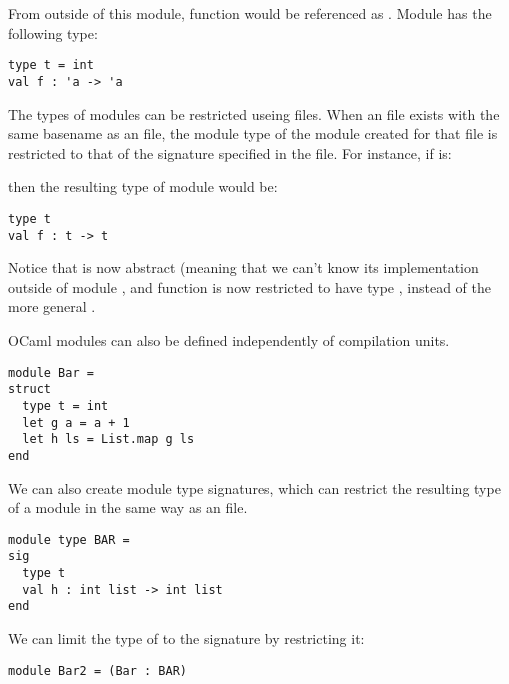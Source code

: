 

From outside of this module, function  would be referenced as
. Module  has the following type:

\begin{lstlisting}
type t = int
val f : 'a -> 'a
\end{lstlisting}

The types of modules can be restricted useing  files. When
an  file exists with the same basename as an  file,
the module type of the module created for that  file is
restricted to that of the signature specified in the 
file. For instance, if  is:



then the resulting type of module  would be:

\begin{lstlisting}
type t
val f : t -> t
\end{lstlisting}

Notice that  is now abstract (meaning that we can't know
its implementation outside of module , and function 
is now restricted to have type , instead of the more
general .

OCaml modules can also be defined independently of compilation
units.

\begin{lstlisting}
module Bar =
struct
  type t = int
  let g a = a + 1
  let h ls = List.map g ls
end
\end{lstlisting}

We can also create module type signatures, which can restrict the
resulting type of a module in the same way as an  file.

\begin{lstlisting}
module type BAR =
sig
  type t
  val h : int list -> int list
end
\end{lstlisting}

We can limit the type of  to the signature
 by restricting it:

\begin{lstlisting}
module Bar2 = (Bar : BAR)
\end{lstlisting}

